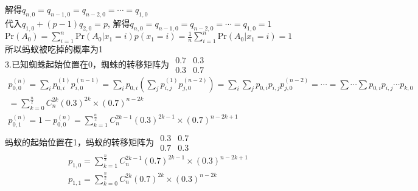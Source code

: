 \documentclass{article}
\begin{document}
    解得$q_{n,0} = q_{n-1, 0} = q_{n-2, 0} = \cdots = q_{1,0}$ \\
    代入$q_{1,0} + (p-1)q_{2, 0} = p$, 解得$q_{n,0} = q_{n-1, 0} = q_{n-2, 0} = \cdots = q_{1,0} = 1$\\
    $\mathrm{Pr}(A_0) = \sum_{i=1}^n \mathrm{Pr}(A_0|x_1=i) p(x_1=i)= \frac{1}{n}\sum_{i=1}^n \mathrm{Pr}(A_0|x_1=i) = 1$\\
    所以蚂蚁被吃掉的概率为1\\
    3.已知蜘蛛起始位置在0，蜘蛛的转移矩阵为
    $\begin{smallmatrix}
            0.7 & 0.3 \\
            0.3 & 0.7 
        \end{smallmatrix}$  
    \begin{gather*}
        p_{0,0}^{(n)} = \sum_i p_{0,i}^{(1)} p_{i,0}^{(n-1)} = \sum_i p_{0,i} (\sum_j p_{i,j}^{(1)} p_{j,0}^{(n-2)})
        = \sum_i \sum_j p_{0,i} p_{i,j} p_{j,0}^{(n-2)} = \cdots = \sum \cdots \sum p_{0,i} p_{i,j} \cdots p_{k,0}\\
        = \sum_{k = 0}^{\frac{n}{2}}C_{n}^{2k } (0.3)^{2k} \times (0.7)^{n - 2k}\\
        p_{0,1}^{(n)} = 1 - p_{0,0}^{(n)} = \sum_{k=1}^{\frac{n}{2}} C_{n}^{2k-1} (0.3)^{2k-1} \times (0.7)^{n-2k + 1}\\    
    \end{gather*}
    蚂蚁的起始位置在1，蚂蚁的转移矩阵为
    $\begin{smallmatrix}
        0.3 & 0.7 \\
        0.7 & 0.3 
    \end{smallmatrix}$
    \begin{gather*}
        p_{1,0} = \sum_{k=1}^{\frac{n}{2}} C_{n}^{2k-1} (0.7)^{2k-1} \times (0.3)^{n - 2k + 1}\\
        p_{1,1} = \sum_{k=0}^{\frac{n}{2}} C_{n}^{2k} (0.7)^{2k} \times (0.3)^{n-2k}
    \end{gather*}
\end{document}
